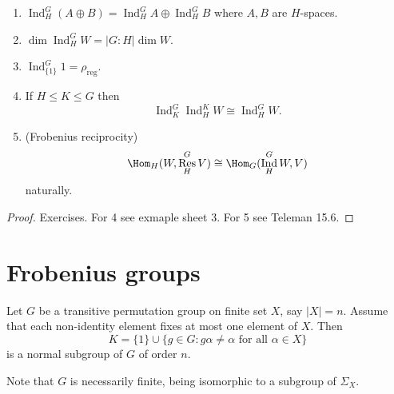 \documentclass[a4paper]{article}
\DeclareMathOperator{\Res}{Res} %
\DeclareMathOperator{\Ind}{Ind} %
\theoremstyle{definition}
\begin{document}
\begin{proposition}\leavevmode
  \begin{enumerate}
  \item \(\Ind_H^G (A \oplus B) = \Ind_H^G A \oplus \Ind_H^G B\) where \(A, B\) are \(H\)-spaces.
  \item \(\dim \Ind_H^G W = |G: H| \dim W\).
  \item \(\Ind_{\{1\}}^G 1 = \rho_{\text{reg}}\).
  \item If \(H \leq K \leq G\) then
    \[
      \Ind^G_K \Ind^K_H W \cong \Ind^G_H W.
    \]
  \item (Frobenius reciprocity)
    \[
      \Hom_H(W, \Res_H^G V) \cong \Hom_G(\Ind_H^G W, V)
    \]
    naturally.
  \end{enumerate}
\end{proposition}

\begin{proof}
  Exercises. For 4 see exmaple sheet 3. For 5 see Teleman 15.6.
\end{proof}

\section{Frobenius groups}

\begin{theorem}
  \label{thm:Frobenius theorem}
  Let \(G\) be a transitive permutation group on finite set \(X\), say \(|X| = n\). Assume that each non-identity element fixes at most one element of \(X\). Then
  \[
    K = \{1\} \cup \{g \in G: g \alpha \neq \alpha \text{ for all } \alpha \in X\}
  \]
  is a normal subgroup of \(G\) of order \(n\).
\end{theorem}
Note that \(G\) is necessarily finite, being isomorphic to a subgroup of \(\Sigma_X\).
\end{document}
